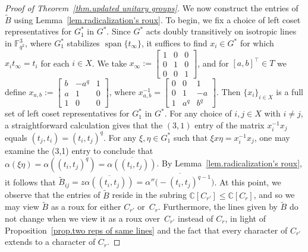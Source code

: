 \begin{proof}[Proof of Theorem~\ref{thm.updated unitary groups}]
We now construct the entries of $\tilde{B}$ using Lemma~\ref{lem.radicalization's roux}.
To begin, we fix a choice of left coset representatives for $G_1^*$ in $G^*$.
Since $G^*$ acts doubly transitively on isotropic lines in $\mathbb{F}_{q^2}^3$, where $G_1^*$ stabilizes $\operatorname{span}\{t_\infty\}$, it suffices to find $x_i\in G^*$ for which $x_it_\infty=t_i$ for each $i\in X$.
We take $x_\infty:=\left[\begin{array}{ccc}1&0&0\\0&1&0\\0&0&1\end{array}\right]$, and for $[a,b]^\top\in T$ we define 
$x_{a,b}:=\left[\begin{array}{ccc}b&-a^q&1\\a&1&0\\1&0&0\end{array}\right]$, 
where 
$x_{a,b}^{-1}=\left[\begin{array}{ccc}0&0&1\\0&1&-a\\1&a^q&b^q\end{array}\right]$.
Then $\{x_i\}_{i\in X}$ is a full set of left coset representatives for $G_1^*$ in $G^*$.
For any choice of $i,j\in X$ with $i\neq j$, a straightforward calculation gives that the $(3,1)$ entry of the matrix $x_i^{-1}x_j$ equals $(t_j,t_i)=(t_i,t_j)^q$.
For any $\xi,\eta\in G_1^*$ such that $\xi x \eta = x_i^{-1}x_j$, one may examine the (3,1) entry to conclude that $\alpha(\xi \eta) = \alpha( (t_i,t_j)^q) = \overline{ \alpha( (t_i,t_j) ) }$.
By Lemma~\ref{lem.radicalization's roux}, it follows that $\tilde{B}_{ij} = z \overline{ \alpha( (t_i,t_j) ) } = \overline{ \alpha''\bigl(- (t_i,t_j)^{q-1} \bigr)}$.
At this point, we observe that the entries of $\tilde{B}$ reside in the subring $\mathbb{C}[C_{r'}] \leq \mathbb{C}[C_{r}]$, and so we may view $\tilde{B}$ as a roux for either $C_{r'}$ or~$C_{r}$.
Furthermore, the lines given by $\tilde{B}$ do not change when we view it as a roux over~$C_{r'}$ instead of $C_r$, in light of Proposition~\ref{prop.two reps of same lines} and the fact that every character of $C_{r'}$ extends to a character of $C_r$.


\end{proof}
